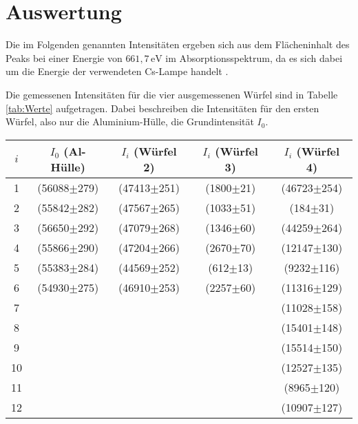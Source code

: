 \newpage
\section{Auswertung}
Die im Folgenden genannten Intensitäten ergeben sich aus dem Flächeninhalt des Peaks bei einer Energie von $661,7\,\text{eV}$
im Absorptionsspektrum, da es sich dabei um die Energie der verwendeten Cs-Lampe handelt \cite{gilmore_practical_2008}.

Die gemessenen Intensitäten für die vier ausgemessenen Würfel sind in Tabelle \ref{tab:Werte} aufgetragen.
Dabei beschreiben die Intensitäten für den ersten Würfel, also nur die Aluminium-Hülle, die Grundintensität $I_0$.
\begin{center}
    \label{tab:Werte}
    \begin{tabular}{c c c c c}
        \toprule
        $i$ & $I_0$ (Al-Hülle) & $I_i$ (Würfel 2) & $I_i$ (Würfel 3) & $I_i$ (Würfel 4) \\
        \midrule
        1  & (56088$\pm$279) & (47413$\pm$251) & (1800$\pm$21) & (46723$\pm$254) \\
        2  & (55842$\pm$282) & (47567$\pm$265) & (1033$\pm$51) & (184$\pm$31) \\
        3  & (56650$\pm$292) & (47079$\pm$268) & (1346$\pm$60) & (44259$\pm$264) \\
        4  & (55866$\pm$290) & (47204$\pm$266) & (2670$\pm$70) & (12147$\pm$130) \\
        5  & (55383$\pm$284) & (44569$\pm$252) & (612$\pm$13)  & (9232$\pm$116) \\
        6  & (54930$\pm$275) & (46910$\pm$253) & (2257$\pm$60) & (11316$\pm$129) \\
        7  &  &  &  & (11028$\pm$158) \\
        8  &  &  &  & (15401$\pm$148) \\
        9  &  &  &  & (15514$\pm$150) \\
        10 &  &  &  & (12527$\pm$135) \\
        11 &  &  &  & (8965$\pm$120) \\
        12 &  &  &  & (10907$\pm$127) \\
        \bottomrule
    \end{tabular}
\end{center}

